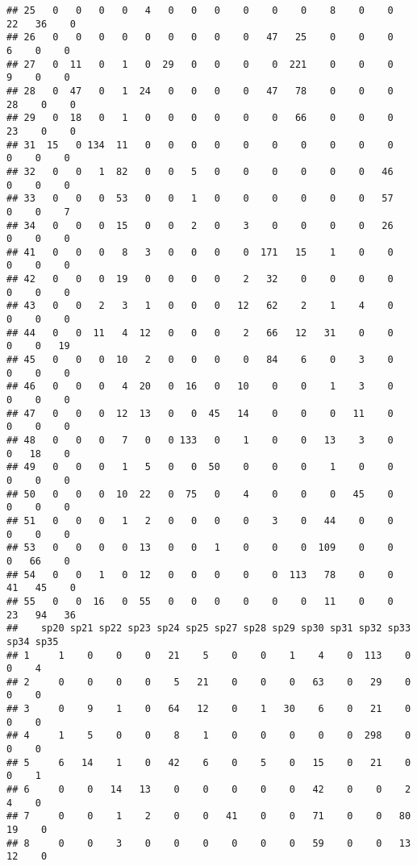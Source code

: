 \documentclass[
]{book}
\begin{document}
\begin{verbatim}
## 25   0   0   0   0   4   0   0   0    0    0    0    8    0    0   22   36    0
## 26   0   0   0   0   0   0   0   0    0   47   25    0    0    0    6    0    0
## 27   0  11   0   1   0  29   0   0    0    0  221    0    0    0    9    0    0
## 28   0  47   0   1  24   0   0   0    0   47   78    0    0    0   28    0    0
## 29   0  18   0   1   0   0   0   0    0    0   66    0    0    0   23    0    0
## 31  15   0 134  11   0   0   0   0    0    0    0    0    0    0    0    0    0
## 32   0   0   1  82   0   0   5   0    0    0    0    0    0   46    0    0    0
## 33   0   0   0  53   0   0   1   0    0    0    0    0    0   57    0    0    7
## 34   0   0   0  15   0   0   2   0    3    0    0    0    0   26    0    0    0
## 41   0   0   0   8   3   0   0   0    0  171   15    1    0    0    0    0    0
## 42   0   0   0  19   0   0   0   0    2   32    0    0    0    0    0    0    0
## 43   0   0   2   3   1   0   0   0   12   62    2    1    4    0    0    0    0
## 44   0   0  11   4  12   0   0   0    2   66   12   31    0    0    0    0   19
## 45   0   0   0  10   2   0   0   0    0   84    6    0    3    0    0    0    0
## 46   0   0   0   4  20   0  16   0   10    0    0    1    3    0    0    0    0
## 47   0   0   0  12  13   0   0  45   14    0    0    0   11    0    0    0    0
## 48   0   0   0   7   0   0 133   0    1    0    0   13    3    0    0   18    0
## 49   0   0   0   1   5   0   0  50    0    0    0    1    0    0    0    0    0
## 50   0   0   0  10  22   0  75   0    4    0    0    0   45    0    0    0    0
## 51   0   0   0   1   2   0   0   0    0    3    0   44    0    0    0    0    0
## 53   0   0   0   0  13   0   0   1    0    0    0  109    0    0    0   66    0
## 54   0   0   1   0  12   0   0   0    0    0  113   78    0    0   41   45    0
## 55   0   0  16   0  55   0   0   0    0    0    0   11    0    0   23   94   36
##    sp20 sp21 sp22 sp23 sp24 sp25 sp27 sp28 sp29 sp30 sp31 sp32 sp33 sp34 sp35
## 1     1    0    0    0   21    5    0    0    1    4    0  113    0    0    4
## 2     0    0    0    0    5   21    0    0    0   63    0   29    0    0    0
## 3     0    9    1    0   64   12    0    1   30    6    0   21    0    0    0
## 4     1    5    0    0    8    1    0    0    0    0    0  298    0    0    0
## 5     6   14    1    0   42    6    0    5    0   15    0   21    0    0    1
## 6     0    0   14   13    0    0    0    0    0   42    0    0    2    4    0
## 7     0    0    1    2    0    0   41    0    0   71    0    0   80   19    0
## 8     0    0    3    0    0    0    0    0    0   59    0    0   13   12    0

\end{verbatim}
\end{document}
